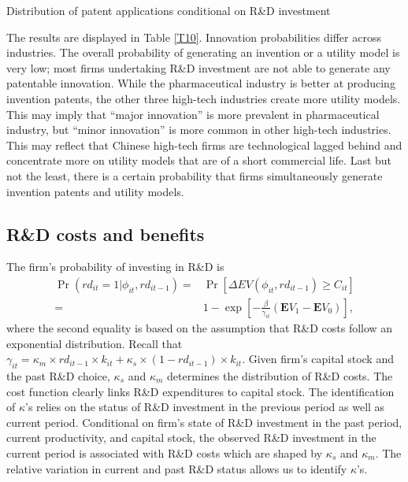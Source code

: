\documentclass[11pt]{article}
\begin{document}
\begin{table}[h]
    \centering
    \caption{Distribution of patent applications conditional on R\&D investment}
    \label{T10}
    
\end{table}

The results are displayed in Table \ref{T10}.
Innovation probabilities differ across industries. The overall probability of generating an invention or a utility model is very low; most firms undertaking R\&D investment are not able to generate any patentable innovation. While the pharmaceutical industry is better at producing invention patents, the other three high-tech industries create more utility models. This may imply that ``major innovation'' is more prevalent in pharmaceutical industry, but ``minor innovation'' is more common in other high-tech industries. This may reflect that Chinese high-tech firms are technological lagged behind and concentrate more on utility models that are of a short commercial life. Last but not the least, there is a certain probability that firms simultaneously generate invention patents and utility models. 

\subsection{R\&D costs and benefits}
The firm's probability of investing in R\&D is
\begin{align}\label{p_d}
\Pr(rd_{it}=1|\phi_{it}, rd_{it-1})=&\Pr\left[\Delta EV(\phi_{it}, rd_{it-1})\geq C_{it}  \right] \\
                    =&1-\exp\left[-  \frac{\beta}{\gamma_{it}} ( \mathbf{E}V_{1}- \mathbf{E}V_{0}) \right], \nonumber
\end{align}
where the second equality is based on the assumption that R\&D costs follow an exponential distribution. Recall that $\gamma_{it} = \kappa_m\times rd_{it-1}\times k_{it}+\kappa_{s}\times(1-rd_{it-1})\times k_{it}$. Given firm's capital stock and the past R\&D choice, $\kappa_s$ and $\kappa_m$ determines the distribution of R\&D costs. The cost function clearly links R\&D expenditures to capital stock. The identification of $\kappa$'s relies on the status of R\&D investment in the previous period as well as current period. Conditional on firm's state of R\&D investment in the past period, current productivity, and capital stock, the observed R\&D investment in the current period is associated with R\&D costs which are shaped by $\kappa_s$ and $\kappa_m$. The relative variation in current and past R\&D status allows us to identify $\kappa$'s. 
\end{document}
